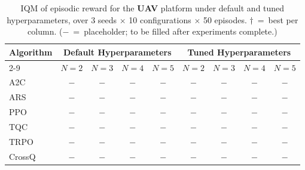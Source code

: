 \documentclass{article}
\begin{document}
\begin{table}[tbp]
\centering
\footnotesize
\caption{\small IQM of episodic reward for the \textbf{UAV} platform under default and tuned hyperparameters, over 3 seeds $\times$ 10 configurations $\times$ 50 episodes. $\dagger$~=~best per column. ($-$~=~placeholder; to be filled after experiments complete.)}
\label{tab:uav_main}
\begin{tabular}{l|cccc|cccc}
    \toprule
    \multirow{2}{*}{\textbf{Algorithm}}
        & \multicolumn{4}{c|}{\textbf{Default Hyperparameters}}
        & \multicolumn{4}{c}{\textbf{Tuned Hyperparameters}} \\
    \cmidrule(lr){2-9}
           & $N=2$ & $N=3$ & $N=4$ & $N=5$
           & $N=2$ & $N=3$ & $N=4$ & $N=5$ \\
    \midrule
    A2C    & $-$ & $-$ & $-$ & $-$ & $-$ & $-$ & $-$ & $-$ \\
    ARS    & $-$ & $-$ & $-$ & $-$ & $-$ & $-$ & $-$ & $-$ \\
    PPO    & $-$ & $-$ & $-$ & $-$ & $-$ & $-$ & $-$ & $-$ \\
    TQC    & $-$ & $-$ & $-$ & $-$ & $-$ & $-$ & $-$ & $-$ \\
    TRPO   & $-$ & $-$ & $-$ & $-$ & $-$ & $-$ & $-$ & $-$ \\
    CrossQ & $-$ & $-$ & $-$ & $-$ & $-$ & $-$ & $-$ & $-$ \\
    \bottomrule
\end{tabular}
\vspace{-6pt}
\end{table}
\end{document}
